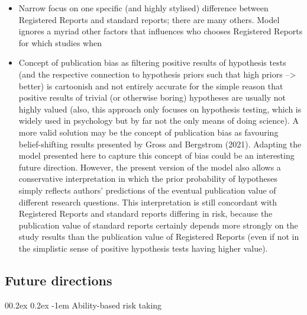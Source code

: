 \documentclass[british,,doc,mask,floatsintext]{apa6}
\makeatletter
\renewcommand{\paragraph}{\@startsection{paragraph}{4}{\parindent}%
  {0\baselineskip \@plus 0.2ex \@minus 0.2ex}%
  {-1em}%
  {\normalfont\normalsize\bfseries\itshape\typesectitle}}
\makeatother
\begin{document}
\begin{itemize}
\item
  Narrow focus on one specific (and highly stylised) difference between Registered Reports and standard reports; there are many others. Model ignores a myriad other factors that influences who chooses Registered Reports for which studies when
\item
  Concept of publication bias as filtering positive results of hypothesis tests (and the respective connection to hypothesis priors such that high priors --\textgreater{} better) is cartoonish and not entirely accurate for the simple reason that positive results of trivial (or otherwise boring) hypotheses are usually not highly valued (also, this approach only focuses on hypothesis testing, which is widely used in psychology but by far not the only means of doing science).
  A more valid solution may be the concept of publication bias as favouring belief-shifting results presented by Gross and Bergstrom (2021).
  Adapting the model presented here to capture this concept of bias could be an interesting future direction.
  However, the present version of the model also allows a conservative interpretation in which the prior probability of hypotheses simply reflects authors' predictions of the eventual publication value of different research questions.
  This interpretation is still concordant with Registered Reports and standard reports differing in risk, because the publication value of standard reports certainly depends more strongly on the study results than the publication value of Registered Reports (even if not in the simplistic sense of positive hypothesis tests having higher value).
\end{itemize}

\hypertarget{future-directions}{%
\subsection{Future directions}\label{future-directions}}

\hypertarget{ability-based-risk-taking}{%
\paragraph{Ability-based risk taking}\label{ability-based-risk-taking}}
\end{document}
